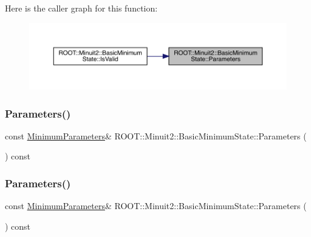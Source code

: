 Here is the caller graph for this function\+:
\nopagebreak
\begin{figure}[H]
\begin{center}
\leavevmode
\includegraphics[width=350pt]{d0/db1/classROOT_1_1Minuit2_1_1BasicMinimumState_a0b72fce84557374c989a6581711e6e6a_icgraph}
\end{center}
\end{figure}
\mbox{\label{classROOT_1_1Minuit2_1_1BasicMinimumState_a0b72fce84557374c989a6581711e6e6a}} 
\subsubsection{\texorpdfstring{Parameters()}{Parameters()}\hspace{0.1cm}{\footnotesize\ttfamily [2/3]}}
{\footnotesize\ttfamily const \mbox{\hyperlink{classROOT_1_1Minuit2_1_1MinimumParameters}{Minimum\+Parameters}}\& R\+O\+O\+T\+::\+Minuit2\+::\+Basic\+Minimum\+State\+::\+Parameters (\begin{DoxyParamCaption}{ }\end{DoxyParamCaption}) const\hspace{0.3cm}{\ttfamily [inline]}}

\mbox{\label{classROOT_1_1Minuit2_1_1BasicMinimumState_a0b72fce84557374c989a6581711e6e6a}} 
\subsubsection{\texorpdfstring{Parameters()}{Parameters()}\hspace{0.1cm}{\footnotesize\ttfamily [3/3]}}
{\footnotesize\ttfamily const \mbox{\hyperlink{classROOT_1_1Minuit2_1_1MinimumParameters}{Minimum\+Parameters}}\& R\+O\+O\+T\+::\+Minuit2\+::\+Basic\+Minimum\+State\+::\+Parameters (\begin{DoxyParamCaption}{ }\end{DoxyParamCaption}) const\hspace{0.3cm}{\ttfamily [inline]}}

